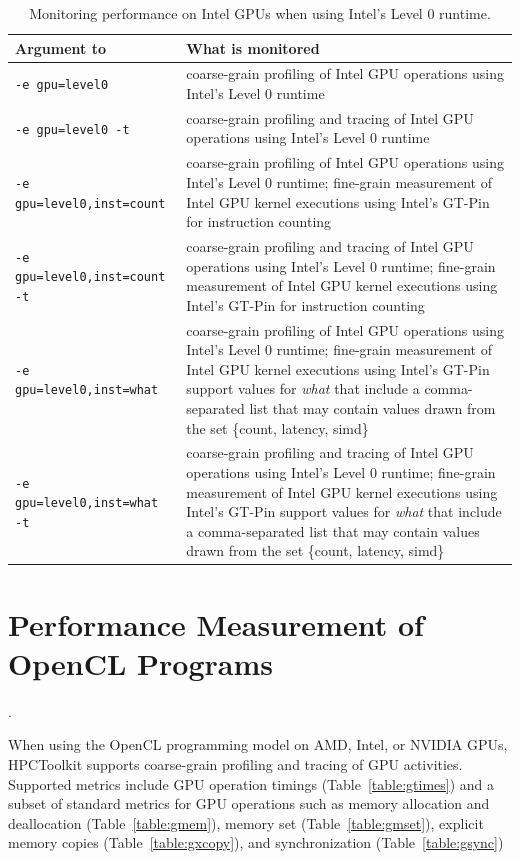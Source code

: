 \begin{table}[t]
\centering
\begin{tabular}{|l|p{3.5in}|}\hline
Argument to \hpcrun{} & What is monitored\\\hline\hline
{\tt -e gpu=level0} & coarse-grain profiling of Intel GPU operations using Intel's Level 0 runtime\\\hline
{\tt -e gpu=level0 -t} & coarse-grain profiling and tracing of Intel GPU operations using Intel's Level 0 runtime\\\hline
{\tt -e gpu=level0,inst=count} & coarse-grain profiling of Intel GPU operations using Intel's Level 0 runtime;  fine-grain measurement of Intel GPU kernel executions using Intel's GT-Pin for instruction counting\\\hline
{\tt -e gpu=level0,inst=count -t } & coarse-grain profiling and tracing of Intel GPU operations using Intel's Level 0 runtime; fine-grain measurement of Intel GPU kernel executions using Intel's GT-Pin for instruction counting\\\hline
{\tt -e gpu=level0,inst=what} & coarse-grain profiling of Intel GPU operations using Intel's Level 0 runtime;  fine-grain measurement of Intel GPU kernel executions using Intel's GT-Pin support values for {\em what} that include a comma-separated list that may contain values drawn from the set \{count, latency, simd\}\\\hline
{\tt -e gpu=level0,inst=what -t } & coarse-grain profiling and tracing of Intel GPU operations using Intel's Level 0 runtime;  fine-grain measurement of Intel GPU kernel executions using Intel's GT-Pin support values for {\em what} that include a comma-separated list that may contain values drawn from the set \{count, latency, simd\}\\\hline
\end{tabular}
\caption{Monitoring performance on Intel GPUs when using Intel's Level 0 runtime.}
\label{intel-level0-options}
\end{table}

\section{Performance Measurement of OpenCL Programs}
\label{sec:gpu-opencl}.


When using the OpenCL programming model on AMD, Intel, or NVIDIA GPUs, HPCToolkit supports coarse-grain profiling and tracing of GPU activities.
Supported metrics include GPU operation timings (Table~\ref{table:gtimes}) and a subset of standard metrics for GPU operations such as memory allocation and deallocation (Table~\ref{table:gmem}), memory set (Table~\ref{table:gmset}), explicit memory copies (Table~\ref{table:gxcopy}), and synchronization (Table~\ref{table:gsync})

